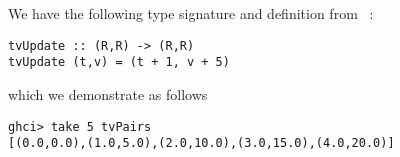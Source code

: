 
We have the following type signature and definition from \
:
\scriptsize\begin{verbatim}
tvUpdate :: (R,R) -> (R,R)
tvUpdate (t,v) = (t + 1, v + 5)
\end{verbatim}\normalsize
which we demonstrate as follows
\scriptsize\begin{verbatim}
ghci> take 5 tvPairs
[(0.0,0.0),(1.0,5.0),(2.0,10.0),(3.0,15.0),(4.0,20.0)]
\end{verbatim}\normalsize
